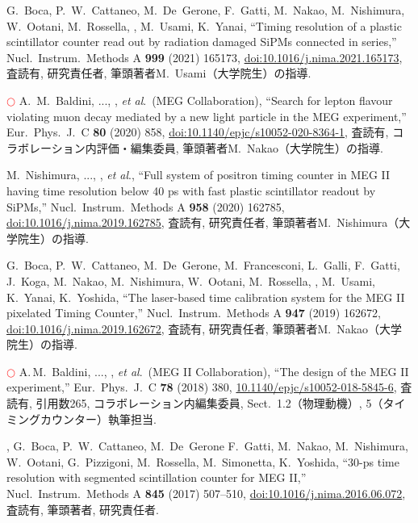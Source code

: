 \begin{enumerate}
G.~Boca, P.~W.~Cattaneo, M.~De~Gerone, F.~Gatti, M.~Nakao, M.~Nishimura, W.~Ootani, M.~Rossella, \me, M.~Usami, K.~Yanai, ``Timing resolution of a plastic scintillator counter read out by radiation damaged SiPMs connected in series,'' Nucl.\ Instrum.\ Methods A {\bf 999} (2021) 165173,
\href{https://doi.org/10.1016/j.nima.2021.165173}{doi:10.1016/j.nima.2021.165173},
査読有, 研究責任者, 筆頭著者M.~Usami（大学院生）の指導.

\textcolor{red}{$\bigcirc$} 
A.~M.~Baldini, ..., \me, {\it et al}.\ (MEG Collaboration),
``Search for lepton flavour violating muon decay mediated by a new light particle in the MEG experiment,'' Eur.\ Phys.\ J.\ C \textbf{80} (2020) 858,
\href{https://doi.org/10.1140/epjc/s10052-020-8364-1}{doi:10.1140/epjc/s10052-020-8364-1},
査読有, コラボレーション内評価・編集委員,  筆頭著者M.~Nakao（大学院生）の指導.

M.~Nishimura, ..., \me, {\it et al}., 
``Full system of positron timing counter in MEG II having time resolution below 40 ps with fast plastic scintillator readout by SiPMs,''
Nucl.\ Instrum.\ Methods A \textbf{958} (2020) 162785,
\href{https://doi.org/10.1016/j.nima.2019.162785}{doi:10.1016/j.nima.2019.162785},
査読有, 研究責任者,  筆頭著者M.~Nishimura（大学院生）の指導.

  G.~Boca, P.~W.~Cattaneo, M.~De~Gerone, M.~Francesconi, L.~Galli, F.~Gatti, J.~Koga,
  M.~Nakao, M.~Nishimura, W.~Ootani, M.~Rossella, \me, M.~Usami, K.~Yanai, K.~Yoshida,
  ``The laser-based time calibration system for the MEG II pixelated Timing Counter,''
  Nucl.\ Instrum.\ Methods A {\bf 947}  (2019) 162672,
  \href{https://doi.org/10.1016/j.nima.2019.162672}{doi:10.1016/j.nima.2019.162672},
  査読有, 研究責任者,  筆頭著者M.~Nakao（大学院生）の指導.
	 
\textcolor{red}{$\bigcirc$} 
A.\,M.~Baldini, ..., \me, {\it et al}.\ (MEG II Collaboration),
  ``The design of the MEG II experiment,''
  Eur.\ Phys.\ J.\ C {\bf 78}  (2018) 380,
  \href{https://doi.org/10.1140/epjc/s10052-018-5845-6}{10.1140/epjc/s10052-018-5845-6},
  査読有, 引用数265, コラボレーション内編集委員, Sect.\ 1.2（物理動機）, 5（タイミングカウンター）執筆担当.

  \me, G.~Boca, P.~W.~Cattaneo, M.~De~Gerone F.~Gatti, M.~Nakao, M.~Nishimura, W.~Ootani, G.~Pizzigoni, M.~Rossella, M.~Simonetta, K.~Yoshida, 
  ``30-ps time resolution with segmented scintillation counter for MEG II,''
  Nucl.\ Instrum.\ Methods A {\bf 845} (2017) 507--510,
  \href{https://doi.org/10.1016/j.nima.2016.06.072}{doi:10.1016/j.nima.2016.06.072},
  査読有, 筆頭著者, 研究責任者.


\end{enumerate}
